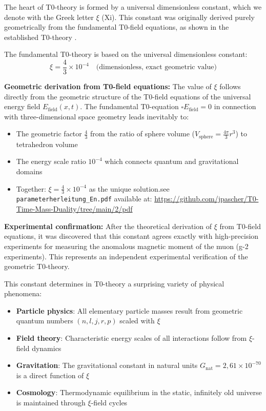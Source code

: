 \documentclass[12pt,a4paper]{article}
\theoremstyle{definition}
\theoremstyle{remark}
\begin{document}
	The heart of T0-theory is formed by a universal dimensionless constant, which we denote with the Greek letter $\xi$ (Xi). This constant was originally derived purely geometrically from the fundamental T0-field equations, as shown in the established T0-theory \cite{T0Theory}.
	
	The fundamental T0-theory is based on the universal dimensionless constant:
	\begin{equation}
		\xi = \frac{4}{3} \times 10^{-4} \quad \text{(dimensionless, exact geometric value)}
	\end{equation}
	
	\textbf{Geometric derivation from T0-field equations:} The value of $\xi$ follows directly from the geometric structure of the T0-field equations of the universal energy field $E_{\text{field}}(x,t)$. The fundamental T0-equation $\square E_{\text{field}} = 0$ in connection with three-dimensional space geometry leads inevitably to:
	\begin{itemize}
		\item The geometric factor $\frac{4}{3}$ from the ratio of sphere volume ($V_{\text{sphere}} = \frac{4\pi}{3}r^3$) to tetrahedron volume
		\item The energy scale ratio $10^{-4}$ which connects quantum and gravitational domains
		\item Together: $\xi = \frac{4}{3} \times 10^{-4}$ as the unique solution.see \texttt{parameterherleitung\_En.pdf} available at:
		\url{https://github.com/jpascher/T0-Time-Mass-Duality/tree/main/2/pdf}
	\end{itemize}
	
	\textbf{Experimental confirmation:} After the theoretical derivation of $\xi$ from T0-field equations, it was discovered that this constant agrees exactly with high-precision experiments for measuring the anomalous magnetic moment of the muon (g-2 experiments). This represents an independent experimental verification of the geometric T0-theory.
	
	This constant determines in T0-theory a surprising variety of physical phenomena:
	\begin{itemize}
		\item \textbf{Particle physics}: All elementary particle masses result from geometric quantum numbers $(n,l,j,r,p)$ scaled with $\xi$
		\item \textbf{Field theory}: Characteristic energy scales of all interactions follow from $\xi$-field dynamics
		\item \textbf{Gravitation}: The gravitational constant in natural units $G_{\text{nat}} = 2{,}61 \times 10^{-70}$ is a direct function of $\xi$
		\item \textbf{Cosmology}: Thermodynamic equilibrium in the static, infinitely old universe is maintained through $\xi$-field cycles
	\end{itemize}
	
\end{document}
